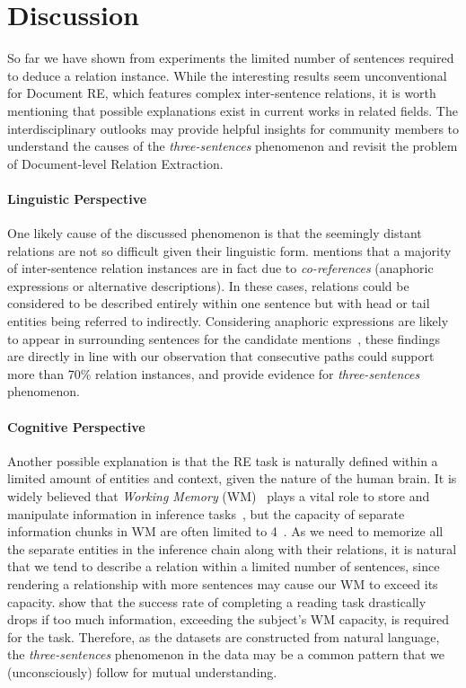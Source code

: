 \documentclass[11pt,a4paper]{article}
\begin{document}
\section{Discussion}
So far we have shown from experiments the limited number of sentences required to deduce a relation instance. While the interesting results seem unconventional for Document RE, which features complex inter-sentence relations, it is worth mentioning that possible explanations exist in current works in related fields. The interdisciplinary outlooks may provide helpful insights for community members to understand the causes of the \textit{three-sentences} phenomenon and revisit the problem of Document-level Relation Extraction.

\paragraph{Linguistic Perspective} 
One likely cause of the discussed phenomenon is that the seemingly distant relations are not so difficult given their linguistic form. \citet{stevenson2006fact} mentions that a majority of inter-sentence relation instances are in fact due to \textit{co-references} (anaphoric expressions or alternative descriptions). In these cases, relations could be considered to be described entirely within one sentence but with head or tail entities being referred to indirectly. Considering anaphoric expressions are likely to appear in surrounding sentences for the candidate mentions~\cite{chowdhury2013controlled}, these findings are directly in line with our observation that consecutive paths could support more than 70\% relation instances, and provide evidence for \textit{three-sentences} phenomenon.

\paragraph{Cognitive Perspective} 
Another possible explanation is that the RE task is naturally defined within a limited amount of entities and context, given the nature of the human brain. It is widely believed that \textit{Working Memory} (WM)~\cite{baddeley1992working} plays a vital role to store and manipulate information in inference tasks~\cite{barreyro2012working}, but the capacity of separate information chunks in WM are often limited to 4~\cite{cowan2001magical}. As we need to memorize all the separate entities in the inference chain along with their relations, 
it is natural that we tend to describe a relation within a limited number of sentences,
since rendering a relationship with more sentences may cause our WM to exceed its capacity. \citet{daneman1980individual} show that the success rate of completing a reading task drastically drops if too much information, exceeding the subject’s WM capacity, is required for the task. Therefore, as the datasets are constructed from natural language, the \textit{three-sentences} phenomenon in the data may be a common pattern that we (unconsciously) follow for mutual understanding.
\end{document}
